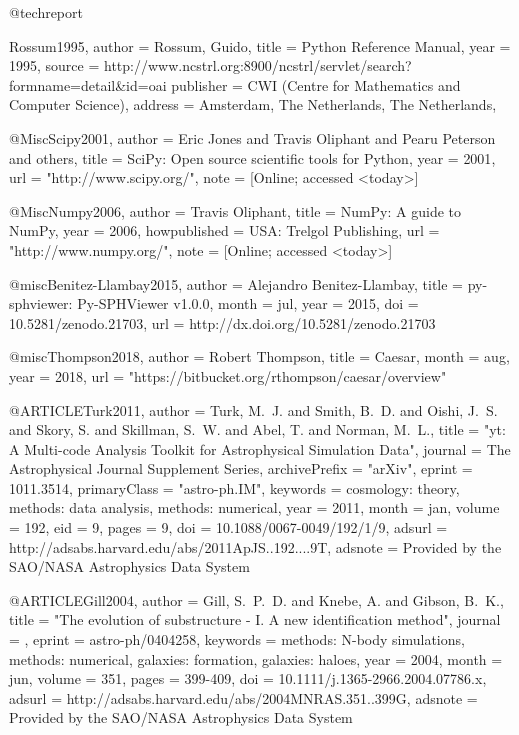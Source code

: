 @techreport{Rossum1995,
 author = {Rossum, Guido},
 title = {Python Reference Manual},
 year = {1995},
 source = {http://www.ncstrl.org:8900/ncstrl/servlet/search?formname=detail\&id=oai%
 publisher = {CWI (Centre for Mathematics and Computer Science)},
 address = {Amsterdam, The Netherlands, The Netherlands},
} 

@Misc{Scipy2001,
  author =    {Eric Jones and Travis Oliphant and Pearu Peterson and others},
  title =     {{SciPy}: Open source scientific tools for {Python}},
  year =      {2001},
  url = "http://www.scipy.org/",
  note = {[Online; accessed <today>]}
}

@Misc{Numpy2006,
  author =    {Travis Oliphant},
  title =     {{NumPy}: A guide to {NumPy}},
  year =      {2006},
  howpublished = {USA: Trelgol Publishing},
  url = "http://www.numpy.org/",
  note = {[Online; accessed <today>]}
 }

@misc{Benitez-Llambay2015,
 author       = {Alejandro Benitez-Llambay},
 title        = {py-sphviewer: Py-SPHViewer v1.0.0},
 month        = jul,
 year         = 2015,
 doi          = {10.5281/zenodo.21703},
 url          = {http://dx.doi.org/10.5281/zenodo.21703}
 }

@misc{Thompson2018,
 author       = {Robert Thompson},
 title        = {Caesar},
 month        = aug,
 year         = 2018,
 url          = {"https://bitbucket.org/rthompson/caesar/overview"}
 }

@ARTICLE{Turk2011,
   author = {{Turk}, M.~J. and {Smith}, B.~D. and {Oishi}, J.~S. and {Skory}, S. and
{Skillman}, S.~W. and {Abel}, T. and {Norman}, M.~L.},
    title = "{yt: A Multi-code Analysis Toolkit for Astrophysical Simulation Data}",
  journal = {The Astrophysical Journal Supplement Series},
archivePrefix = "arXiv",
   eprint = {1011.3514},
 primaryClass = "astro-ph.IM",
 keywords = {cosmology: theory, methods: data analysis, methods: numerical},
     year = 2011,
    month = jan,
   volume = 192,
      eid = {9},
    pages = {9},
      doi = {10.1088/0067-0049/192/1/9},
   adsurl = {http://adsabs.harvard.edu/abs/2011ApJS..192....9T},
  adsnote = {Provided by the SAO/NASA Astrophysics Data System}
}

@ARTICLE{Gill2004,
   author = {{Gill}, S.~P.~D. and {Knebe}, A. and {Gibson}, B.~K.},
    title = "{The evolution of substructure - I. A new identification method}",
  journal = {\mnras},
   eprint = {astro-ph/0404258},
 keywords = {methods: N-body simulations, methods: numerical, galaxies: formation, galaxies: haloes},
     year = 2004,
    month = jun,
   volume = 351,
    pages = {399-409},
      doi = {10.1111/j.1365-2966.2004.07786.x},
   adsurl = {http://adsabs.harvard.edu/abs/2004MNRAS.351..399G},
  adsnote = {Provided by the SAO/NASA Astrophysics Data System}
}

}
